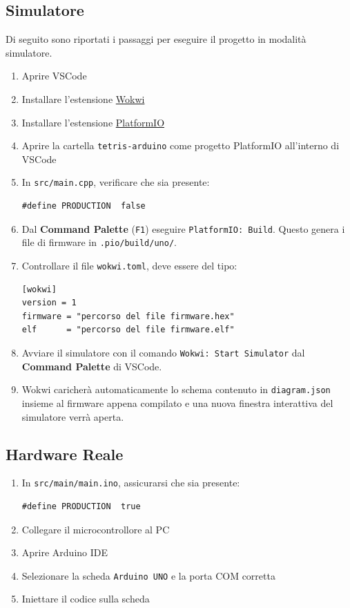 \documentclass[a4paper, 12pt]{article}
\begin{document}
\subsection{Simulatore}
Di seguito sono riportati i passaggi per eseguire il progetto in modalità simulatore.
\begin{enumerate}
    \item Aprire VSCode
    \item Installare l'estensione \href{https://marketplace.visualstudio.com/items?itemName=Wokwi.wokwi-vscode}{Wokwi}
    \item Installare l'estensione \href{https://marketplace.visualstudio.com/items?itemName=platformio.platformio-ide}{PlatformIO}
    \item Aprire la cartella \texttt{tetris-arduino} come progetto PlatformIO all'interno di VSCode
    \item In \texttt{src/main.cpp}, verificare che sia presente:
          \begin{lstlisting}
#define PRODUCTION  false
	      \end{lstlisting}
    \item Dal \textbf{Command Palette} (\texttt{F1}) eseguire \texttt{PlatformIO: Build}.
          Questo genera i file di firmware in \texttt{.pio/build/uno/}.
    \item Controllare il file \texttt{wokwi.toml}, deve essere del tipo:
          \begin{verbatim}
[wokwi]
version = 1
firmware = "percorso del file firmware.hex"
elf      = "percorso del file firmware.elf"
	      \end{verbatim}
    \item Avviare il simulatore con il comando \texttt{Wokwi: Start Simulator} dal \textbf{Command Palette} di VSCode.
    \item Wokwi caricherà automaticamente lo schema contenuto in \texttt{diagram.json} insieme al firmware appena compilato e una nuova finestra interattiva del simulatore verrà aperta.
\end{enumerate}

\subsection{Hardware Reale}
\begin{enumerate}
    \item In \texttt{src/main/main.ino}, assicurarsi che sia presente:
          \begin{lstlisting}
#define PRODUCTION  true
	      \end{lstlisting}
    \item Collegare il microcontrollore al PC
    \item Aprire Arduino IDE
    \item Selezionare la scheda \texttt{Arduino UNO} e la porta COM corretta
    \item Iniettare il codice sulla scheda
\end{enumerate}
\end{document}
